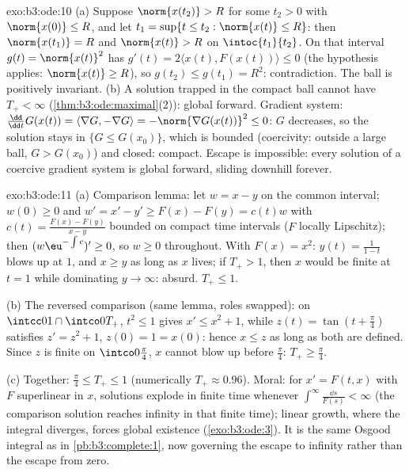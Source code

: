 \begin{solution}{exo:b3:ode:10}
(a) Suppose $\norm{x(t_2)} > R$ for some $t_2 > 0$ with
$\norm{x(0)} \leq R$, and let $t_1 = \sup\{t \leq t_2 :
\norm{x(t)} \leq R\}$: then $\norm{x(t_1)} = R$ and
$\norm{x(t)} > R$ on $\intoc{t_1}{t_2}$. On that interval
$g(t) = \norm{x(t)}^2$ has $g'(t) = 2\langle x(t),
F(x(t))\rangle \leq 0$ (the hypothesis applies: $\norm{x(t)}
\geq R$), so $g(t_2) \leq g(t_1) = R^2$: contradiction. The
ball is positively invariant.
(b) A solution trapped in the compact ball cannot have
$T_+ < \infty$ (\cref{thm:b3:ode:maximal}(2)): global
forward. Gradient system: $\frac{\dd}{\dd t}G(x(t)) =
\langle\nabla G, -\nabla G\rangle = -\norm{\nabla G(x(t))}^2
\leq 0$: $G$ decreases, so the solution stays in $\{G \leq
G(x_0)\}$, which is bounded (coercivity: outside a large
ball, $G > G(x_0)$) and closed: compact. Escape is
impossible: every solution of a coercive gradient system is
global forward, sliding downhill forever.
\end{solution}

\begin{solution}{exo:b3:ode:11}
(a) Comparison lemma: let $w = x - y$ on the common
interval; $w(0) \geq 0$ and $w' = x' - y' \geq F(x) - F(y) =
c(t)w$ with $c(t) = \frac{F(x) - F(y)}{x - y}$ bounded on
compact time intervals ($F$ locally Lipschitz); then
$(w\eu^{-\int c})' \geq 0$, so $w \geq 0$ throughout. With
$F(x) = x^2$: $y(t) = \frac1{1 - t}$ blows up at $1$, and $x
\geq y$ as long as $x$ lives; if $T_+ > 1$, then $x$ would
be finite at $t = 1$ while dominating $y \to \infty$:
absurd. $T_+ \leq 1$.

(b) The reversed comparison (same lemma, roles swapped):
on $\intcc01\cap\intco0{T_+}$, $t^2 \leq 1$ gives $x' \leq
x^2 + 1$, while $z(t) = \tan(t + \frac\pi4)$ satisfies $z' =
z^2 + 1$, $z(0) = 1 = x(0)$: hence $x \leq z$ as long as
both are defined. Since $z$ is finite on
$\intco0{\frac\pi4}$, $x$ cannot blow up before
$\frac\pi4$: $T_+ \geq \frac\pi4$.

(c) Together: $\frac\pi4 \leq T_+ \leq 1$ (numerically $T_+
\approx 0.96$). Moral: for $x' = F(t, x)$ with $F$
superlinear in $x$, solutions explode in finite time
whenever $\int^\infty\frac{\dd s}{F(s)} < \infty$ (the
comparison solution reaches infinity in that finite time);
linear growth, where the integral diverges, forces global
existence (\cref{exo:b3:ode:3}). It is the same Osgood
integral as in \cref{pb:b3:complete:1}, now governing the
escape to infinity rather than the escape from zero.
\end{solution}

